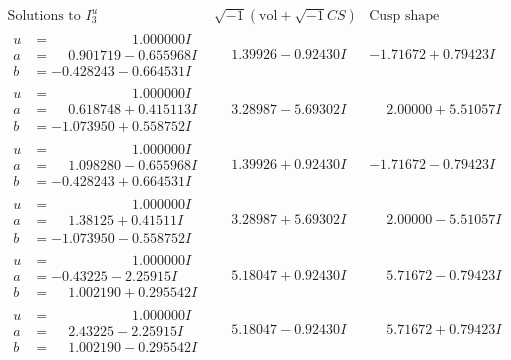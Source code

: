 \documentclass[1p]{elsarticle_modified}
\theoremstyle{definition}
\newcommand{\I}{\sqrt{-1}}
\begin{document}
$$\begin{array}{c|c|c}  
\text{Solutions to }I^u_{3}& \I (\text{vol} + \sqrt{-1}CS) & \text{Cusp shape}\\
 \hline 
\begin{aligned}
u &= \phantom{-0.000000 -}1.000000 I \\
a &= \phantom{-}0.901719 - 0.655968 I \\
b &= -0.428243 - 0.664531 I\end{aligned}
 & \phantom{-}1.39926 - 0.92430 I & -1.71672 + 0.79423 I \\ \hline\begin{aligned}
u &= \phantom{-0.000000 -}1.000000 I \\
a &= \phantom{-}0.618748 + 0.415113 I \\
b &= -1.073950 + 0.558752 I\end{aligned}
 & \phantom{-}3.28987 - 5.69302 I & \phantom{-}2.00000 + 5.51057 I \\ \hline\begin{aligned}
u &= \phantom{-0.000000 -}1.000000 I \\
a &= \phantom{-}1.098280 - 0.655968 I \\
b &= -0.428243 + 0.664531 I\end{aligned}
 & \phantom{-}1.39926 + 0.92430 I & -1.71672 - 0.79423 I \\ \hline\begin{aligned}
u &= \phantom{-0.000000 -}1.000000 I \\
a &= \phantom{-}1.38125 + 0.41511 I \\
b &= -1.073950 - 0.558752 I\end{aligned}
 & \phantom{-}3.28987 + 5.69302 I & \phantom{-}2.00000 - 5.51057 I \\ \hline\begin{aligned}
u &= \phantom{-0.000000 -}1.000000 I \\
a &= -0.43225 - 2.25915 I \\
b &= \phantom{-}1.002190 + 0.295542 I\end{aligned}
 & \phantom{-}5.18047 + 0.92430 I & \phantom{-}5.71672 - 0.79423 I \\ \hline\begin{aligned}
u &= \phantom{-0.000000 -}1.000000 I \\
a &= \phantom{-}2.43225 - 2.25915 I \\
b &= \phantom{-}1.002190 - 0.295542 I\end{aligned}
 & \phantom{-}5.18047 - 0.92430 I & \phantom{-}5.71672 + 0.79423 I \\ \hline\begin{aligned}

\end{aligned}
\end{array}$$
\end{document}
